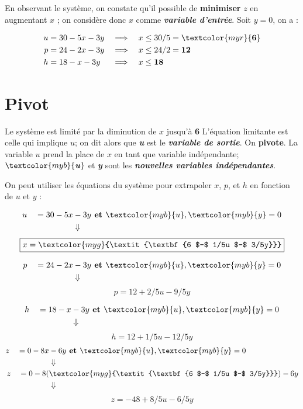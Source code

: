 \documentclass{report}
\begin{document}
\begin{multicols*}{3}
En observant le système, on constate qu'il possible de 
\textbf{minimiser} $z$ en augmentant $x$ ; on considère 
donc $x$ comme \textcolor{myb}{\textbf{\textit{variable d'entrée}}}. Soit 
$y = 0$, on a :

\begin{align*}
    u &= 30 - 5x -3y& 
    \implies \quad 
    & x \leq 30/5 = \textcolor{myr}{\textbf{6}}  
    \\
    p &= 24 -2x -3y 
    & \implies \quad  &  x \leq 24/2 = \textbf{12}  
    \\
    h &= 18 - x -3y&
    \implies \quad & x \leq \textbf{18}  
\end{align*}


\section{Pivot}

Le système est limité par la diminution de $x$ jusqu'à \textcolor{myr}{\textbf{6}} 
L'équation limitante est celle qui implique $u$; on dit alors que 
\textcolor{myr}{\textbf{\textit{u}}} est le 
\textcolor{myr}{\textbf{\textit{variable de sortie}}}. On 
\textbf{pivote}. La variable $u$ prend la place de $x$ en tant que
variable indépendante;
$\textcolor{myb}{\textbf{\textit{u}}}$ et  
\textcolor{myb}{\textbf{\textit{y}}} sont les 
\textcolor{myb}{\textbf{\textit{nouvelles variables indépendantes}}}.   

On peut utiliser les équations du système pour extrapoler 
$x$, $p$, et $h$ en fonction de $u$ et $y$ :


\begin{align*}
    u \quad = 30 - 5x &- 3y 
    \textbf{ et } \textcolor{myb}{u}, \textcolor{myb}{y} = 0 
    \\
                         &\Downarrow
\end{align*}
      \[%
          \boxed{x = \textcolor{myg}{\textit{\textbf{6 $-$ 1/5u $-$ 3/5y}}}}
      \]%


\begin{align*}
    p \quad = 24 - 2x &- 3y
    \textbf{ et } \textcolor{myb}{u}, \textcolor{myb}{y} = 0 
    \\
                 &\Downarrow
\end{align*}
      \[%
    \boxed{p = 12 +2/5u -9/5y}
      \]%

\begin{align*}
    h \quad = 18 - x &- 3y
    \textbf{ et } \textcolor{myb}{u}, \textcolor{myb}{y} = 0 
    \\
                     &\Downarrow
\end{align*}
      \[%
    \boxed{h = 12 +1/5u -12/5y}
      \]%
\begin{align*}
    z \quad = 0 - 8x &- 6y
    \textbf{ et } \textcolor{myb}{u}, \textcolor{myb}{y} = 0 
    \\
                     &\Downarrow
    \\
    z \quad = 0 - 8(&\textcolor{myg}{\textit{\textbf{6 $-$ 1/5u $-$ 3/5y}}})
 - 6y
    \\ 
                    &\Downarrow
\end{align*}
      \[%
    \boxed{z = -48 +8/5u -6/5y}
      \]%


\end{multicols*}
\end{document}
